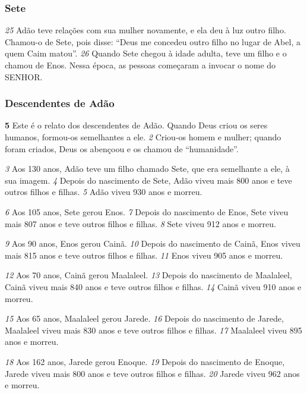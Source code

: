 \bigskip
\subsubsection*{Sete}
\textit{\tiny 25}
Adão teve relações com sua mulher novamente, e ela deu à luz outro filho.
Chamou-o de Sete, pois disse: “Deus me concedeu outro filho no lugar de Abel, a
quem Caim matou”.  
\textit{\tiny 26}
Quando Sete chegou à idade adulta, teve um filho e o
chamou de Enos. Nessa época, as pessoas começaram a invocar o nome do
SENHOR.

\bigskip
\subsubsection*{Descendentes de Adão}
\textbf{\large 5} 
Este é o relato dos descendentes de Adão. Quando Deus criou os seres
humanos, formou-os semelhantes a ele. 
\textit{\tiny 2}
Criou-os homem e mulher; quando
foram criados, Deus os abençoou e os chamou de “humanidade”.

\bigskip
\textit{\tiny 3}
Aos   130 anos, Adão teve um filho chamado Sete, que era semelhante a ele, à sua
 imagem. 
\textit{\tiny 4}
Depois do nascimento de Sete, Adão viveu mais 800 anos e teve outros
 filhos e filhas. 
\textit{\tiny 5}
Adão viveu 930 anos e morreu.

\bigskip
\textit{\tiny 6}
Aos 105 anos, Sete gerou Enos. 
\textit{\tiny 7}
Depois do nascimento de Enos, Sete viveu mais 807 anos e teve outros filhos e filhas. 
\textit{\tiny 8}
Sete viveu 912 anos e morreu.

\bigskip
\textit{\tiny 9}
Aos 90 anos, Enos gerou Cainã. 
\textit{\tiny 10}
Depois do nascimento de Cainã, Enos viveu mais 815 anos e teve outros filhos e filhas.  
\textit{\tiny 11}
Enos viveu 905 anos e morreu.

\bigskip
\textit{\tiny 12}
Aos 70 anos, Cainã gerou Maalaleel.  
\textit{\tiny 13}
Depois do nascimento de Maalaleel,
 Cainã viveu mais 840 anos e teve outros filhos e filhas.  
\textit{\tiny 14}
Cainã viveu 910 anos e morreu.

\bigskip
\textit{\tiny 15}
Aos 65 anos, Maalaleel gerou Jarede.  
\textit{\tiny 16}
Depois do nascimento de Jarede,
 Maalaleel viveu mais 830 anos e teve outros filhos e filhas.  
\textit{\tiny 17}
Maalaleel viveu 895 anos e morreu.

\bigskip
\textit{\tiny 18}
Aos 162 anos, Jarede gerou Enoque.  
\textit{\tiny 19}
Depois do nascimento de Enoque, Jarede
 viveu mais 800 anos e teve outros filhos e filhas.  
\textit{\tiny 20}
Jarede viveu 962 anos e
 morreu.

